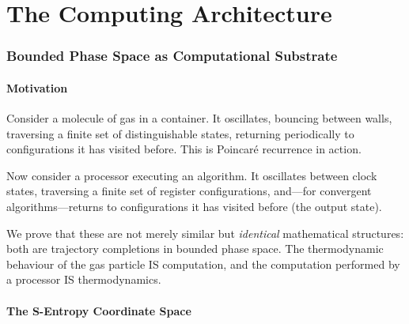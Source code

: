 \documentclass[twocolumn,10pt,a4paper]{article}
\theoremstyle{plain}
\theoremstyle{definition}
\theoremstyle{remark}
\begin{document}

\part{The Computing Architecture}
\label{part:architecture}

\section{Bounded Phase Space as Computational Substrate}
\label{sec:substrate}

\subsection{Motivation}

Consider a molecule of gas in a container. It oscillates, bouncing between walls, traversing a finite set of distinguishable states, returning periodically to configurations it has visited before. This is Poincar\'{e} recurrence in action.

Now consider a processor executing an algorithm. It oscillates between clock states, traversing a finite set of register configurations, and---for convergent algorithms---returns to configurations it has visited before (the output state).

We prove that these are not merely similar but \emph{identical} mathematical structures: both are trajectory completions in bounded phase space. The thermodynamic behaviour of the gas particle IS computation, and the computation performed by a processor IS thermodynamics.

\subsection{The S-Entropy Coordinate Space}
\end{document}

